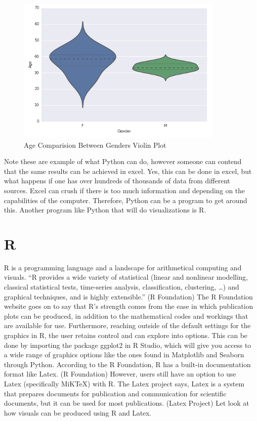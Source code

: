 \documentclass[sigconf]{acmart}
\begin{document}
\begin{figure}[htb]
  \centering
  \includegraphics[width=1.0\columnwidth]{paper2/Graph 3.png}
  \caption{Age Comparision Between Genders Violin Plot
  \cite{Sunil Ray }}
  \label{fig:Graph 3} 
\end{figure}

Note these are example of what Python can do, however someone can contend that the same results can be achieved in excel. Yes, this can be done in excel, but what happens if one has over hundreds of thousands of data from different sources. Excel can crush if there is too much information and depending on the capabilities of the computer. Therefore, Python can be a program to get around this. Another program like Python that will do visualizations is R. 

\section{R}
R is a programming language and a landscape for arithmetical computing and visuals. “R provides a wide variety of statistical (linear and nonlinear modelling, classical statistical tests, time-series analysis, classification, clustering, …) and graphical techniques, and is highly extensible.” (R Foundation) The R Foundation website goes on to say that R’s strength comes from the ease in which publication plots can be produced, in addition to the mathematical codes and workings that are available for use. Furthermore, reaching outside of the default settings for the graphics in R, the user retains control and can explore into options. This can be done by importing the package ggplot2 in R Studio, which will give you access to a wide range of graphics options like the ones found in Matplotlib and Seaborn through Python. According to the R Foundation, R has a built-in documentation format like Latex. (R Foundation) However, users still have an option to use Latex (specifically MiKTeX) with R. The Latex project says, Latex is a system that prepares documents for publication and communication for scientific documents, but it can be used for most publications. (Latex Project) Let look at how visuals can be produced using R and Latex. 
\end{document}
